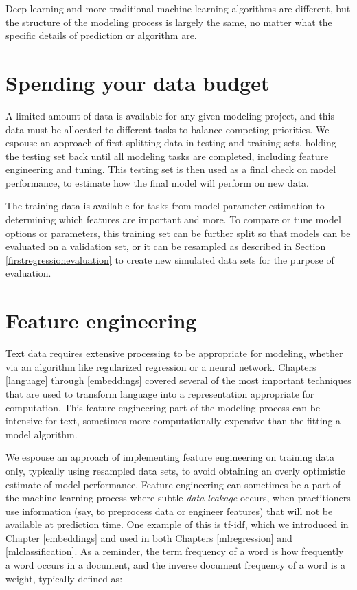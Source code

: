 \documentclass[
]{krantz}
\begin{document}
Deep learning and more traditional machine learning algorithms are different, but the structure of the modeling process is largely the same, no matter what the specific details of prediction or algorithm are.

\hypertarget{spending-your-data-budget}{%
\section*{Spending your data budget}\label{spending-your-data-budget}}


A limited amount of data is available for any given modeling project, and this data must be allocated to different tasks to balance competing priorities. We espouse an approach of first splitting data in testing and training sets, holding the testing set back until all modeling tasks are completed, including feature engineering and tuning. This testing set is then used as a final check on model performance, to estimate how the final model will perform on new data.

The training data is available for tasks from model parameter estimation to determining which features are important and more. To compare or tune model options or parameters, this training set can be further split so that models can be evaluated on a validation set, or it can be resampled as described in Section \ref{firstregressionevaluation} to create new simulated data sets for the purpose of evaluation.

\hypertarget{feature-engineering}{%
\section*{Feature engineering}\label{feature-engineering}}


\thispagestyle{myheadings}

Text data requires extensive processing to be appropriate for modeling, whether via an algorithm like regularized regression or a neural network. Chapters \ref{language} through \ref{embeddings} covered several of the most important techniques that are used to transform language into a representation appropriate for computation. This feature engineering part of the modeling process can be intensive for text, sometimes more computationally expensive than the fitting a model algorithm.

We espouse an approach of implementing feature engineering on training data only, typically using resampled data sets, to avoid obtaining an overly optimistic estimate of model performance. Feature engineering can sometimes be a part of the machine learning process where subtle \emph{data leakage} occurs, when practitioners use information (say, to preprocess data or engineer features) that will not be available at prediction time. One example of this is tf-idf, which we introduced in Chapter \ref{embeddings} and used in both Chapters \ref{mlregression} and \ref{mlclassification}. As a reminder, the term frequency of a word is how frequently a word occurs in a document, and the inverse document frequency of a word is a weight, typically defined as:
\end{document}
